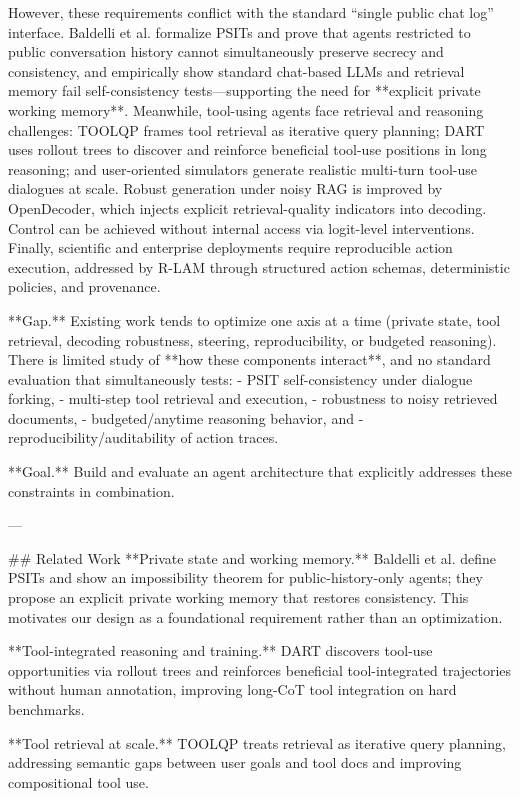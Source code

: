 However, these requirements conflict with the standard “single public chat log” interface. Baldelli et al. formalize PSITs and prove that agents restricted to public conversation history cannot simultaneously preserve secrecy and consistency, and empirically show standard chat-based LLMs and retrieval memory fail self-consistency tests—supporting the need for **explicit private working memory**. Meanwhile, tool-using agents face retrieval and reasoning challenges: TOOLQP frames tool retrieval as iterative query planning; DART uses rollout trees to discover and reinforce beneficial tool-use positions in long reasoning; and user-oriented simulators generate realistic multi-turn tool-use dialogues at scale. Robust generation under noisy RAG is improved by OpenDecoder, which injects explicit retrieval-quality indicators into decoding. Control can be achieved without internal access via logit-level interventions. Finally, scientific and enterprise deployments require reproducible action execution, addressed by R-LAM through structured action schemas, deterministic policies, and provenance.

**Gap.** Existing work tends to optimize one axis at a time (private state, tool retrieval, decoding robustness, steering, reproducibility, or budgeted reasoning). There is limited study of **how these components interact**, and no standard evaluation that simultaneously tests:  
- PSIT self-consistency under dialogue forking,  
- multi-step tool retrieval and execution,  
- robustness to noisy retrieved documents,  
- budgeted/anytime reasoning behavior, and  
- reproducibility/auditability of action traces.

**Goal.** Build and evaluate an agent architecture that explicitly addresses these constraints in combination.

---

## Related Work  
**Private state and working memory.** Baldelli et al. define PSITs and show an impossibility theorem for public-history-only agents; they propose an explicit private working memory that restores consistency. This motivates our design as a foundational requirement rather than an optimization.

**Tool-integrated reasoning and training.** DART discovers tool-use opportunities via rollout trees and reinforces beneficial tool-integrated trajectories without human annotation, improving long-CoT tool integration on hard benchmarks.

**Tool retrieval at scale.** TOOLQP treats retrieval as iterative query planning, addressing semantic gaps between user goals and tool docs and improving compositional tool use.


